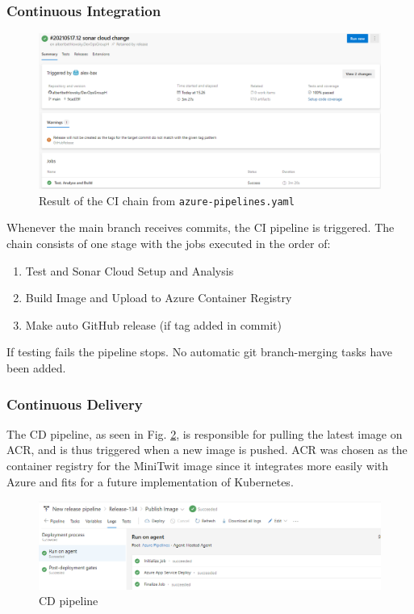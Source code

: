 \documentclass{article}
\begin{document}
\subsubsection*{Continuous Integration}
\begin{figure}[H]
\centering
\includegraphics[width=1\textwidth]{images/pipeline-result.png}
\caption{\label{fig:res} Result of the CI chain from \texttt{azure-pipelines.yaml}}
\end{figure}
Whenever the main branch receives commits, the CI pipeline is triggered. The chain consists of one stage with the jobs executed in the order of: 
\begin{enumerate}
    \item Test and Sonar Cloud Setup and Analysis
    \item Build Image and Upload to Azure Container Registry 
    \item Make auto GitHub release (if tag added in commit)
\end{enumerate}

If testing fails the pipeline stops. No automatic git branch-merging tasks have been added. %

\subsubsection*{Continuous Delivery}
The CD pipeline, as seen in Fig. \ref{fig:release}, is responsible for pulling the latest image on ACR, and is thus triggered when a new image is pushed. ACR was chosen as the container registry for the MiniTwit image since it integrates more easily with Azure and fits for a future implementation of Kubernetes. 
\begin{figure}[H]
\centering
\includegraphics[width=1\textwidth]{images/devops-result.png}
\caption{\label{fig:release} CD pipeline}
\end{figure}
\end{document}
